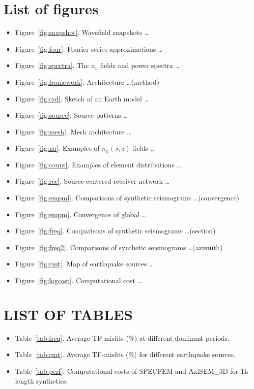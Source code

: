 \documentclass[extra,referee]{gji}
\begin{document}
\section*{List of figures}
\begin{itemize}
  \item Figure~\ref{fig:snapshot}. Wavefield snapshots \dots
  \item Figure~\ref{fig:four}. Fourier series approximations \dots
  \item Figure~\ref{fig:spectra}. The $n_v$ fields and power spectra \dots
  \item Figure~\ref{fig:framework}. Architecture \dots (method)
  \item Figure~\ref{fig:crd}. Sketch of an Earth model \dots
  \item Figure~\ref{fig:source}. Source patterns \dots
  \item Figure~\ref{fig:mesh}. Mesh architecture \dots
  \item Figure~\ref{fig:nu}. Examples of $n_u\left(s,z\right)$ fields \dots
  \item Figure~\ref{fig:count}. Examples of element distributions \dots
  \item Figure~\ref{fig:rec}. Source-centered receiver network \dots
  \item Figure~\ref{fig:empml}. Comparisons of synthetic seismograms \dots (convergence)
  \item Figure~\ref{fig:empm}. Convergence of global \dots
  \item Figure~\ref{fig:freq}. Comparisons of synthetic seismograms \dots (section)
  \item Figure~\ref{fig:freq2}. Comparisons of synthetic seismograms \dots (azimuth)
  \item Figure~\ref{fig:cmt}. Map of earthquake sources \dots
  \item Figure~\ref{fig:logcost}. Computational cost \dots
\end{itemize}

\section*{LIST OF TABLES}
\begin{itemize}
  \item Table~\ref{tab:freq}. Average TF-misfits ($\%$) at different dominant periods.
  \item Table~\ref{tab:cmt}. Average TF-misfits ($\%$) for different earthquake sources.
  \item Table~\ref{tab:perf}. Computational costs of SPECFEM and AxiSEM\_3D for 1h-length synthetics.
\end{itemize}
\end{document}
